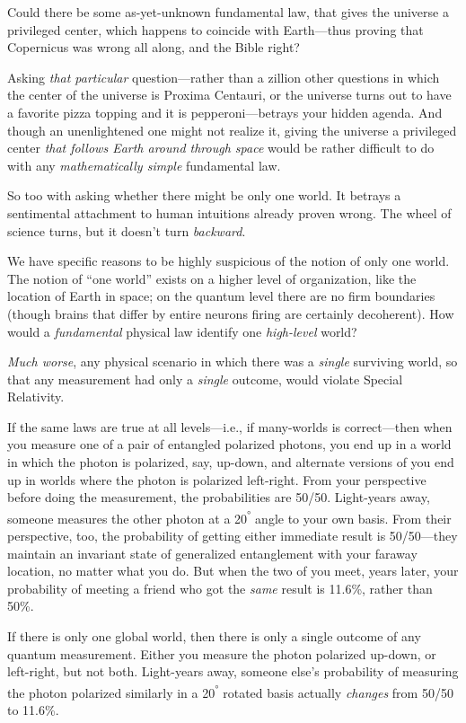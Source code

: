 {
 Could there be some as-yet-unknown fundamental law, that gives the
universe a privileged center, which happens to coincide with
Earth---thus proving that Copernicus was wrong all along, and the Bible
right?}

{
 Asking \textit{that particular} question---rather than a zillion
other questions in which the center of the universe is Proxima
Centauri, or the universe turns out to have a favorite pizza topping
and it is pepperoni---betrays your hidden agenda. And though an
unenlightened one might not realize it, giving the universe a
privileged center \textit{that follows Earth around through space}
would be rather difficult to do with any \textit{mathematically simple}
fundamental law.}

{
 So too with asking whether there might be only one world. It
betrays a sentimental attachment to human intuitions already proven
wrong. The wheel of science turns, but it doesn't turn
\textit{backward}.}

{
 We have specific reasons to be highly suspicious of the notion of
only one world. The notion of ``one
world'' exists on a higher level of organization,
like the location of Earth in space; on the quantum level there are no
firm boundaries (though brains that differ by entire neurons firing are
certainly decoherent). How would a \textit{fundamental} physical law
identify one \textit{high-level} world?}

{
 \textit{Much worse}, any physical scenario in which there was a
\textit{single} surviving world, so that any measurement had only a
\textit{single} outcome, would violate Special Relativity.}

{
 If the same laws are true at all levels---i.e., if many-worlds is
correct---then when you measure one of a pair of entangled polarized
photons, you end up in a world in which the photon is polarized, say,
up-down, and alternate versions of you end up in worlds where the
photon is polarized left-right. From your perspective before doing the
measurement, the probabilities are 50/50. Light-years away, someone
measures the other photon at a 20\textsuperscript{°} angle to your own
basis. From their perspective, too, the probability of getting either
immediate result is 50/50---they maintain an invariant state of
generalized entanglement with your faraway location, no matter what you
do. But when the two of you meet, years later, your probability of
meeting a friend who got the \textit{same} result is 11.6\%, rather
than 50\%.}

{
 If there is only one global world, then there is only a single
outcome of any quantum measurement. Either you measure the photon
polarized up-down, or left-right, but not both. Light-years away,
someone else's probability of measuring the photon
polarized similarly in a 20\textsuperscript{°} rotated basis actually
\textit{changes} from 50/50 to 11.6\%.}

